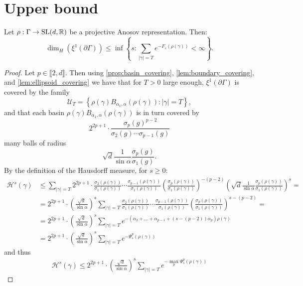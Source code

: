 \documentclass{report}
\begin{document}
\chapter{Upper bound}
\begin{lemma}
Let $\rho: \Gamma \to \operatorname{{\mathrm{SL}}}(d, \mathbb R)$ be a projective Anosov representation. 
Then:
\[
    \dim_H(\xi^1 (\partial \Gamma) ) \leq
    \inf 
    \left\{ 
        s :  
        \sum_{|\gamma| = T} e^{-F_s(\rho(\gamma))}  < \infty
    \right\}.
\]
\end{lemma}
\begin{proof}
Let $p \in \llbracket 2, d \rrbracket$.
Then using \cref{prop:basin_covering}, \cref{lem:boundary_covering}, and \cref{lem:ellipsoid_covering} we have that for $T>0$ large enough, $\xi^1(\partial \Gamma)$ is covered by the family
\[
    \mathcal U_T = \left\{ \rho(\gamma) B_{\alpha_1, \alpha}(\rho(\gamma)) : |\gamma| = T \right\},
\]
and that each basin $\rho(\gamma) B_{\alpha_1, \alpha}(\rho(\gamma))$ is in turn covered by
\[
    2^{2p+1} \cdot \frac{\sigma_p(g)^{p-2}}{\sigma_2(g) \cdots \sigma_{p-1}(g)}
\]
many balls of radius
\[
    \sqrt{d} \frac{1}{\sin \alpha} \frac{\sigma_p(g)}{\sigma_1(g)}.
\]
By the definition of the Hausdorff measure, for $s \geq 0$:
\begin{align*}
    \mathcal H^s(\gamma) &\leq
    \sum_{|\gamma| = T}
        2^{2p+1} \cdot 
        \frac{\sigma_2(\rho(\gamma))}{\sigma_1(\rho(\gamma))} \cdots 
            \frac{\sigma_{p-1}(\rho(\gamma))}{\sigma_1(\rho(\gamma))}
        \left(
            \frac{\sigma_p(\rho(\gamma))}{\sigma_1(\rho(\gamma))}
        \right)^{-(p-2)}
        \left(
            \sqrt{d} \frac{1}{\sin \alpha} \frac{\sigma_p(\rho(\gamma))}{\sigma_1(\rho(\gamma))}
        \right)^s =\\
        &=
        2^{2p+1} \cdot \left( \frac{\sqrt{d}}{\sin \alpha}\right)^s  
        \sum_{|\gamma| = T} 
        \frac{\sigma_2(\rho(\gamma))}{\sigma_1(\rho(\gamma))} \cdots 
            \frac{\sigma_{p-1}(\rho(\gamma))}{\sigma_1(\rho(\gamma))}
        \left(
            \frac{\sigma_p(\rho(\gamma))}{\sigma_1(\rho(\gamma))}
        \right)^{s-(p-2)} =\\
        &=
        2^{2p+1} \cdot \left( \frac{\sqrt{d}}{\sin \alpha}\right)^s  
        \sum_{|\gamma| = T}
        e^{-\left( \alpha_2 + \ldots + \alpha_{p-1} + (s - (p-2))\alpha_p \right)\rho(\gamma)}\\
        &=
        2^{2p+1} \cdot \left( \frac{\sqrt{d}}{\sin \alpha}\right)^s  
        \sum_{|\gamma| = T}
        e^{-\Psi_s^p(\rho(\gamma))}
\end{align*}
and thus
\begin{align*}
    \mathcal H^s(\gamma) \leq
    2^{2p+1} \cdot \left( \frac{\sqrt{d}}{\sin \alpha}\right)^s
    \sum_{|\gamma| = T}
    e^{-\max_p \Psi_s^p(\rho(\gamma)) }
\end{align*}
\end{proof}
\end{document}
